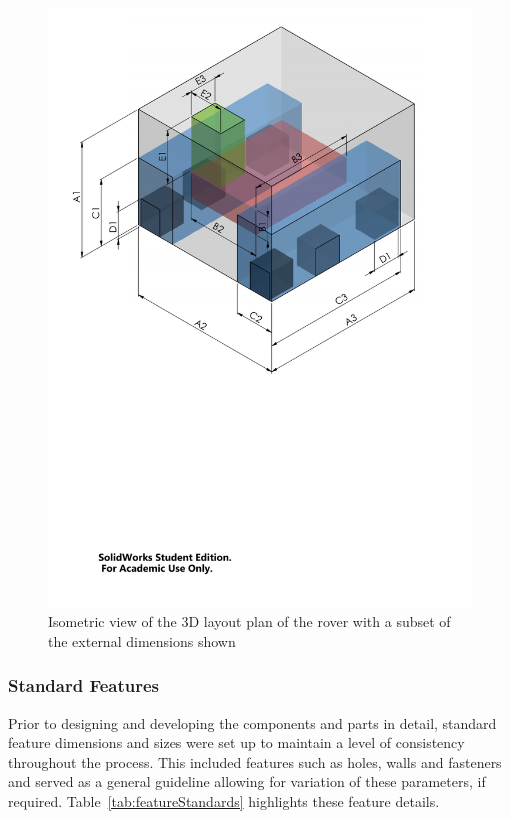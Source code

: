       \begin{figure}[h!]
        \centering
        \includegraphics[clip, trim=1cm 11cm 1cm 0cm, width=0.9\linewidth]{figures/mechDesign-layoutPlan}
        \caption[Isometric view of the 3D layout plan of the rover with a subset of the external dimensions shown]{Isometric view of the 3D layout plan of the rover with a subset of the external dimensions shown}
        \label{fig:mechDesign-layoutPlan}
      \end{figure}

      
    \subsubsection{Standard Features}
      Prior to designing and developing the components and parts in detail, standard feature dimensions and sizes were set up to maintain a level of consistency throughout the process. This included features such as holes, walls and fasteners and served as a general guideline allowing for variation of these parameters, if required. Table~\ref{tab:featureStandards} highlights these feature details.
      
